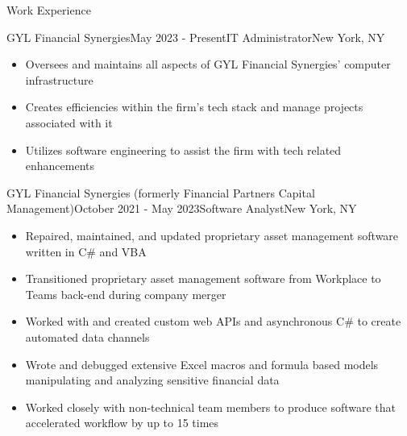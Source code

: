 \documentclass{resume} %
\begin{document}
\begin{rSection}{Work Experience}


\begin{rSubsection}
{GYL Financial Synergies}{May 2023 - Present}{IT Administrator}{New York, NY}
\item[]\renewcommand\labelitemi{$\vcenter{\hbox{\tiny$\bullet$}}$}\begin{itemize}
    \item Oversees and maintains all aspects of GYL Financial Synergies' computer infrastructure
    \vspace{-1mm}
    \item Creates efficiencies within the firm's tech stack and manage projects associated with it
    \vspace{-1mm}
    \item Utilizes software engineering to assist the firm with tech related enhancements
    \vspace{-1mm}
    
\end{itemize}
\end{rSubsection}
\begin{rSubsection}
{GYL Financial Synergies (formerly Financial Partners Capital Management)}{October 2021 - May 2023}{Software Analyst}{New York, NY}
\item[]\renewcommand\labelitemi{$\vcenter{\hbox{\tiny$\bullet$}}$}\begin{itemize}
    \item Repaired, maintained, and updated proprietary asset management software written in C\# and VBA
    \vspace{-1mm}
    \item Transitioned proprietary asset management software from Workplace to Teams back-end during company merger
    \vspace{-1mm}
    \item Worked with and created custom web APIs and asynchronous C\# to create automated data channels 
    \vspace{-1mm}
    \item Wrote and debugged extensive Excel macros and formula based models manipulating and analyzing sensitive financial data
    \vspace{-1mm}
    \item Worked closely with non-technical team members to produce software that accelerated workflow by up to 15 times
    
\end{itemize}
\end{rSubsection}
\vspace{-1mm}
\end{rSection}
\end{document}
